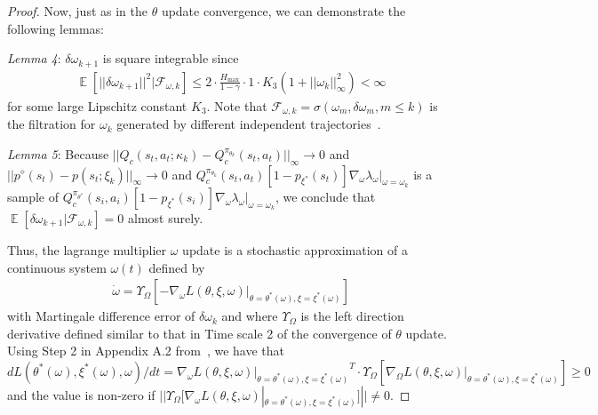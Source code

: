 \documentclass{article}
\theoremstyle{definition}
\DeclareMathOperator*{\E}{\mathbb{E}}
\begin{document}
\begin{proof}
Now, just as in the $\theta$ update convergence, we can demonstrate the following lemmas: 

\emph{Lemma 4}: $\delta \omega_{k+1}$ is square integrable since
\begin{align*}
    \E[||\delta\omega_{k+1}||^2| \mathcal{F}_{\omega,k}] \leq 2\cdot \frac{H_{\max}}{1-\gamma}\cdot 1 \cdot K_3(1 + ||\omega_k||^2_\infty) < \infty
\end{align*}
for some large Lipschitz constant $K_3$. Note that $\mathcal{F}_{\omega,k}=\sigma(\omega_m, \delta \omega_m, m\leq k)$ is the filtration for $\omega_k$ generated by different independent trajectories~\cite{chow2017risk}.

\emph{Lemma 5}: Because $||Q_c(s_t, a_t; \kappa_k)-Q^{\pi_{\theta_k}}_c(s_t, a_t)||_\infty \rightarrow 0$ and $||p^\diamond(s_t)-p(s_t; \xi_k)||_\infty \rightarrow 0$ and $Q^{\pi_{\theta_k}}_c(s_t, a_t)[1-p_{\xi^*}(s_t)] \nabla_\omega \lambda_\omega |_{\omega=\omega_k}$ is a sample of $Q^{\pi_{\theta^*}}_c(s_i,a_i)[1-p_{\xi^*}(s_i)]\nabla_\omega \lambda_\omega |_{\omega=\omega_k}$, we conclude that $\E[\delta \omega_{k+1} | \mathcal{F}_{\omega, k}]=0$ almost surely.

Thus, the lagrange multiplier $\omega$ update is a stochastic approximation of a continuous system $\omega(t)$ defined by~\cite{borkar2009stochastic}
\begin{align}
\label{eqn:OmegaODE}
    \dot{\omega} = \Upsilon_\Omega[-\nabla_\omega L(\theta, \xi, \omega)|_{\theta=\theta^*(\omega),\xi=\xi^*(\omega)}]
\end{align}
with Martingale difference error of $\delta \omega_k$ and where $\Upsilon_\Omega$ is the left direction derivative defined similar to that in Time scale 2 of the convergence of $\theta$ update. Using Step 2 in Appendix A.2 from~\cite{chow2017risk}, we have that $dL(\theta^*(\omega),\xi^*(\omega),\omega)/dt=\nabla_\omega {L(\theta,\xi,\omega)|_{\theta=\theta^*(\omega),\xi=\xi^*(\omega)}}^T\cdot \Upsilon_\Omega[\nabla_\Omega L(\theta, \xi, \omega)|_{\theta=\theta^*(\omega),\xi=\xi^*(\omega)}] \geq 0$ and the value is non-zero if $||\Upsilon_\Omega[\nabla_\omega L(\theta, \xi, \omega)|_{\theta=\theta^*(\omega),\xi=\xi^*(\omega)}]|| \neq 0$. 


\end{proof}
\end{document}
